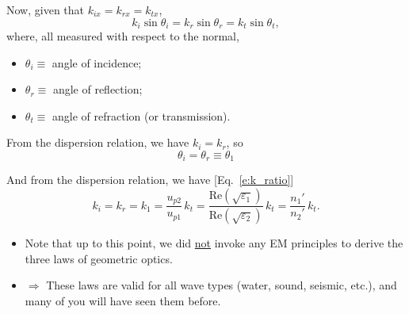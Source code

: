 \documentclass[11pt, oneside]{article}
\begin{document}
Now, given that $k_{ix} = k_{rx} = k_{tx}$,
\begin{equation}
	\label{e:phase_match}
	k_i\sin\theta_i = k_r\sin\theta_r = k_t\sin\theta_t,
\end{equation}
where, all measured with respect to the normal,
\begin{itemize}
	\item $\theta_i \equiv$ angle of incidence;
	\item $\theta_r \equiv$ angle of reflection;
	\item $\theta_t \equiv$ angle of refraction (or transmission).
\end{itemize}
From the dispersion relation, we have $k_i = k_r$, so
\begin{equation}
	\boxed{\theta_i = \theta_r \equiv \theta_1}
\end{equation}

\begin{center}
\end{center}

And from the dispersion relation, we have [Eq.~\eqref{e:k_ratio}]
\begin{equation}
	k_i = k_r = k_1 = \frac{u_{p2}}{u_{p1}}\,k_t = \frac{\mathrm{Re}\left(\sqrt{\varepsilon_1}\right)}{\mathrm{Re}\left(\sqrt{\varepsilon_2}\right)}\,k_t = \frac{n_1'}{n_2'}\,k_t.
\end{equation}

\begin{center}
\end{center}

\begin{itemize}
	\item Note that up to this point, we did \underline{not} invoke any EM principles to derive the three laws of geometric optics.
	\item[] $\Rightarrow$ These laws are valid for all wave types (water, sound, seismic, etc.), and many of you will have seen them before.
\end{itemize}
\end{document}
